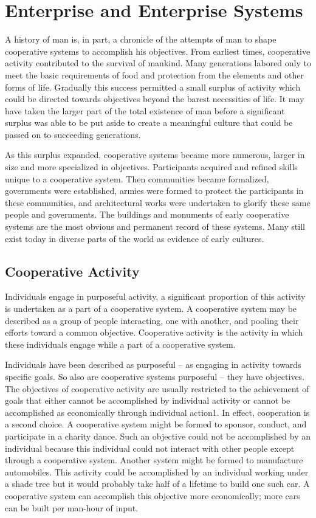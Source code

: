 \section{Enterprise and Enterprise Systems}

A history of man is, in part, a chronicle of the attempts of man to shape cooperative systems to accomplish his objectives. From earliest times, cooperative activity contributed to the survival of mankind. Many generations labored only to meet the basic requirements of food and protection from the elements and other forms of life. Gradually this success permitted a small surplus of activity which could be directed towards objectives beyond the barest necessities of life. It may have taken the larger part of the total existence of man before a significant surplus was able to be put aside to create a meaningful culture that could be passed on to succeeding generations.

As this surplus expanded, cooperative systems became more numerous, larger in size and more specialized in objectives. Participants acquired and refined skills unique to a cooperative system. Then communities became formalized, governments were established, armies were formed to protect the participants in these communities, and architectural works were undertaken to glorify these same people and governments. The buildings and monuments of early cooperative systems are the most obvious and permanent record of these systems. Many still exist today in diverse parts of the world as evidence of early cultures.

\subsection{Cooperative Activity}

Individuals engage in purposeful activity, a significant proportion of this activity is undertaken as a part of a cooperative system.
A cooperative system may be described as a group of people interacting, one with another, and pooling their efforts toward a common objective. Cooperative activity is the activity in which these individuals engage while a part of a cooperative system.

Individuals have been described as purposeful – as engaging in activity towards specific goals. So also are cooperative systems purposeful – they have objectives. The objectives of cooperative activity are usually restricted to the achievement of goals that either cannot be accomplished by individual activity or cannot be accomplished as economically through individual action1. In effect, cooperation is a second choice. A cooperative system might be formed to sponsor, conduct, and participate in a charity dance. Such an objective could not be accomplished by an individual because this individual could not interact with other people except through a cooperative system. Another system might be formed to manufacture automobiles. This activity could be accomplished by an individual working under a shade tree but it would probably take half of a lifetime to build one such car. A cooperative system can accomplish this objective more economically; more cars can be built per man-hour of input.

